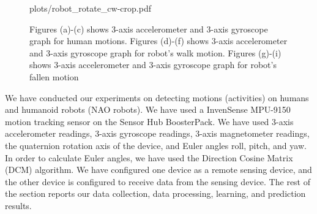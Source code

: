 \documentclass[letterpaper]{article}
\begin{document}
\begin{sloppy}
\begin{figure}[!t]
{{plots/robot_rotate_cw-crop.pdf}}
\\

\caption{Figures (a)-(c) shows 3-axis accelerometer and 3-axis gyroscope graph for human motions. Figures (d)-(f) shows 3-axis accelerometer and 3-axis gyroscope graph for robot's walk motion. Figures (g)-(i) shows 3-axis accelerometer and 3-axis gyroscope graph for robot's fallen motion}
 \label{fig:anotation-human-robot} 
\end{figure}


We have conducted our experiments on detecting motions (activities) on 
humans and humanoid robots (NAO robots). We have used a InvenSense MPU-9150 
motion tracking sensor on the Sensor Hub BoosterPack. 
% 
% 
We have used 3-axis accelerometer readings, 3-axis gyroscope readings, 3-axis magnetometer readings, 
the quaternion rotation axis of the device, and Euler angles roll, pitch, and yaw.  In order to 
calculate Euler angles, we have used the Direction Cosine Matrix (DCM) algorithm. We have configured 
one device as a remote sensing device, and the other device is configured to receive data from the 
sensing device. The rest of the  section reports our data collection, data processing, learning, 
and prediction results.



\end{sloppy}
\end{document}
